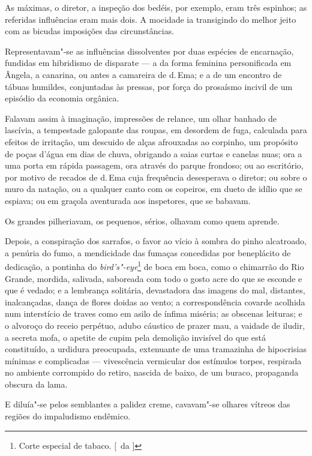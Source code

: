 As máximas, o diretor, a inspeção dos
bedéis, por exemplo, eram três espinhos; as referidas influências eram
mais dois. A mocidade ia transigindo do melhor jeito com as bicudas
imposições das circunstâncias. 

Representavam"-se as influências
dissolventes por duas espécies de encarnação, fundidas em hibridismo de
disparate --- a da forma feminina personificada em Ângela, a canarina,
ou antes a camareira de d.\,Ema; e a de um encontro de tábuas humildes,
conjuntadas às pressas, por força do prosaísmo incivil de um episódio
da economia orgânica. 

Falavam assim à imaginação, impressões de
relance, um olhar banhado de lascívia, a tempestade galopante das
roupas, em desordem de fuga, calculada para efeitos de irritação, um
descuido de alças afrouxadas ao corpinho, um propósito de poças d'água
em dias de chuva, obrigando a saias curtas e canelas nuas; ora a uma
porta em rápida passagem, ora através do parque frondoso; ou ao
escritório, por motivo de recados de d.\,Ema cuja frequência desesperava o diretor;
ou sobre o muro da natação, ou a qualquer canto com os copeiros, em
dueto de idílio que se espiava; ou em graçola aventurada aos
inspetores, que se babavam. 

Os grandes pilheriavam, os pequenos,
sérios, olhavam como quem aprende. 

Depois, a conspiração dos sarrafos,
o favor ao vício à sombra do pinho alcatroado, a penúria do fumo, a
mendicidade das fumaças concedidas por beneplácito de dedicação, a
pontinha do \textit{bird's"-eye}\footnote{ Corte especial de tabaco. [~da ]} 
de boca em boca, como o chimarrão do Rio
Grande, mordida, salivada, saboreada com todo o gosto acre do que se
esconde e que é vedado; e a lembrança solitária, devastadora das
imagens do mal, distantes, inalcançadas, dança de flores doidas ao
vento; a correspondência covarde acolhida num interstício de traves
como em asilo de ínfima miséria; as obscenas leituras; e o alvoroço do
receio perpétuo, adubo cáustico de prazer mau, a vaidade de iludir, a
secreta mofa, o apetite de cupim pela demolição invisível do que está
constituído, a urdidura preocupada, extenuante de uma tramazinha de
hipocrisias mínimas e complicadas --- vivescência vermicular dos
estímulos torpes, respirada no ambiente corrompido do retiro, nascida
de baixo, de um buraco, propaganda obscura da lama. 

E diluía"-se pelos semblantes a palidez creme, cavavam"-se 
olhares vítreos das regiões do impaludismo endêmico. 

